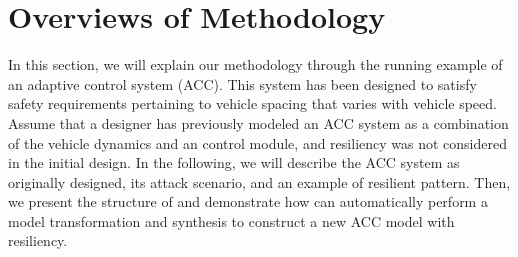 \section{Overviews of Methodology}
%
%
In this section, we will explain our methodology through the running example of an adaptive control system (ACC). This system has been designed to satisfy safety requirements pertaining to vehicle spacing that varies with vehicle speed.
%
Assume that a designer has previously modeled an ACC system as a combination of the vehicle dynamics and an control module, and resiliency was not considered in the initial design. In the following, we will describe the ACC system as originally designed, its attack scenario, and an example of resilient pattern. 
%
Then, we present the structure of \toolreaffirm and demonstrate how \toolreaffirm can automatically perform a model transformation and synthesis to construct a new ACC model with resiliency. 
%
%
%

